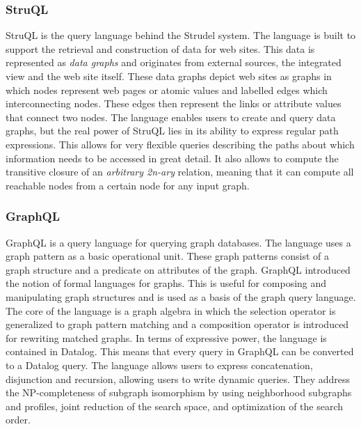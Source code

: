 \subsubsection*{StruQL}

StruQL is the query language behind the Strudel system\cite{Fernandez97aquery}. The language is built to support the retrieval and construction of data for web sites. This data is represented as \textit{data graphs} and originates from external sources, the integrated view and the web site itself. These data graphs depict web sites as graphs in which nodes represent web pages or atomic values and labelled edges which interconnecting nodes. These edges then represent the links or attribute values that connect two nodes. The language enables users to create and query data graphs, but the real power of StruQL lies in its ability to express regular path expressions. This allows for very flexible queries describing the paths about which information needs to be accessed in great detail.
It also allows to compute the transitive closure of an \textit{arbitrary 2n-ary} relation, meaning that it can compute all reachable nodes from a certain node for any input graph. 

\subsubsection*{GraphQL}

GraphQL\cite{He:2008} is a query language for querying graph databases. The language uses a graph pattern as a basic operational unit. These graph patterns consist of a graph structure and a predicate on attributes of the graph. GraphQL introduced the notion of formal languages for graphs. This is useful for composing and manipulating graph structures and is used as a basis of the graph query language.
The core of the language is a graph algebra in which the selection operator is generalized to graph pattern matching and a composition operator is introduced for rewriting matched graphs. In terms of expressive power, the language is contained in Datalog. This means that every query in GraphQL can be converted to a Datalog query. The language allows users to express concatenation, disjunction and recursion, allowing users to write dynamic queries. They address the NP-completeness of subgraph isomorphism by using neighborhood subgraphs and profiles, joint reduction of the search space, and optimization of the search order.

